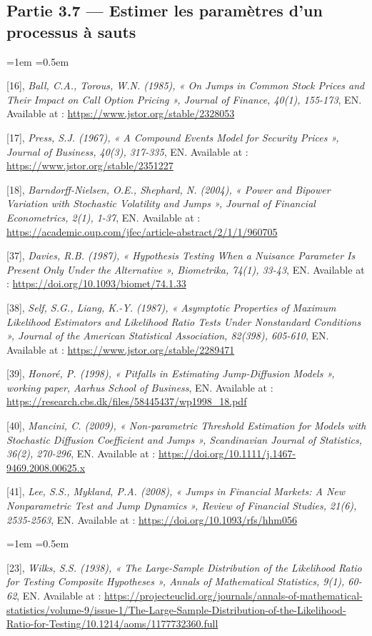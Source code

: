 \documentclass{article}
\begin{document}
\subsection*{Partie 3.7 --- Estimer les paramètres d'un processus à sauts}
\begin{list}{}{\leftmargin=1em \itemsep=0.5em}
\item \hypertarget{ref16}{} [16], \textit{Ball, C.A., Torous, W.N. (1985), « On Jumps in Common Stock Prices and Their Impact on Call Option Pricing », Journal of Finance, 40(1), 155-173}, EN. Available at : \url{https://www.jstor.org/stable/2328053}
\item \hypertarget{ref17}{} [17], \textit{Press, S.J. (1967), « A Compound Events Model for Security Prices », Journal of Business, 40(3), 317-335}, EN. Available at : \url{https://www.jstor.org/stable/2351227}
\item \hypertarget{ref18}{} [18], \textit{Barndorff-Nielsen, O.E., Shephard, N. (2004), « Power and Bipower Variation with Stochastic Volatility and Jumps », Journal of Financial Econometrics, 2(1), 1-37}, EN. Available at : \url{https://academic.oup.com/jfec/article-abstract/2/1/1/960705}
\item \hypertarget{ref37}{} [37], \textit{Davies, R.B. (1987), « Hypothesis Testing When a Nuisance Parameter Is Present Only Under the Alternative », Biometrika, 74(1), 33-43}, EN. Available at : \url{https://doi.org/10.1093/biomet/74.1.33}
\item \hypertarget{ref38}{} [38], \textit{Self, S.G., Liang, K.-Y. (1987), « Asymptotic Properties of Maximum Likelihood Estimators and Likelihood Ratio Tests Under Nonstandard Conditions », Journal of the American Statistical Association, 82(398), 605-610}, EN. Available at : \url{https://www.jstor.org/stable/2289471}
\item \hypertarget{ref39}{} [39], \textit{Honoré, P. (1998), « Pitfalls in Estimating Jump-Diffusion Models », working paper, Aarhus School of Business}, EN. Available at : \url{https://research.cbs.dk/files/58445437/wp1998_18.pdf}
\item \hypertarget{ref40}{} [40], \textit{Mancini, C. (2009), « Non-parametric Threshold Estimation for Models with Stochastic Diffusion Coefficient and Jumps », Scandinavian Journal of Statistics, 36(2), 270-296}, EN. Available at : \url{https://doi.org/10.1111/j.1467-9469.2008.00625.x}
\item \hypertarget{ref41}{} [41], \textit{Lee, S.S., Mykland, P.A. (2008), « Jumps in Financial Markets: A New Nonparametric Test and Jump Dynamics », Review of Financial Studies, 21(6), 2535-2563}, EN. Available at : \url{https://doi.org/10.1093/rfs/hhm056}
\end{list}
\begin{list}{}{\leftmargin=1em \itemsep=0.5em}
\item \hypertarget{ref23}{} [23], \textit{Wilks, S.S. (1938), « The Large-Sample Distribution of the Likelihood Ratio for Testing Composite Hypotheses », Annals of Mathematical Statistics, 9(1), 60-62}, EN. Available at : \url{https://projecteuclid.org/journals/annals-of-mathematical-statistics/volume-9/issue-1/The-Large-Sample-Distribution-of-the-Likelihood-Ratio-for-Testing/10.1214/aoms/1177732360.full}
\end{list}
\end{document}
